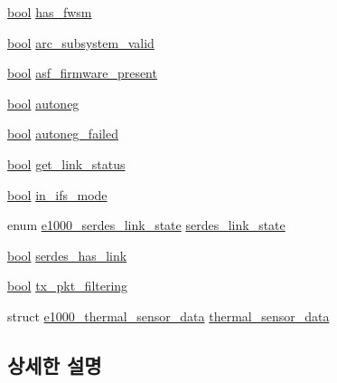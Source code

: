 \begin{DoxyCompactItemize}
\item 
\hyperlink{avb__gptp_8h_af6a258d8f3ee5206d682d799316314b1}{bool} \hyperlink{structe1000__mac__info_a7e6a1e5d6d88bd8bd3ad0b38791562ac}{has\+\_\+fwsm}
\item 
\hyperlink{avb__gptp_8h_af6a258d8f3ee5206d682d799316314b1}{bool} \hyperlink{structe1000__mac__info_accbb8e3943e55029a810bd38b616a8f0}{arc\+\_\+subsystem\+\_\+valid}
\item 
\hyperlink{avb__gptp_8h_af6a258d8f3ee5206d682d799316314b1}{bool} \hyperlink{structe1000__mac__info_aec5701ac9ed699c35dc2accc35b1c473}{asf\+\_\+firmware\+\_\+present}
\item 
\hyperlink{avb__gptp_8h_af6a258d8f3ee5206d682d799316314b1}{bool} \hyperlink{structe1000__mac__info_a062c0e2af8df1b0f13d20b02dceae500}{autoneg}
\item 
\hyperlink{avb__gptp_8h_af6a258d8f3ee5206d682d799316314b1}{bool} \hyperlink{structe1000__mac__info_a323c5f398a127c5668b296a71e00572e}{autoneg\+\_\+failed}
\item 
\hyperlink{avb__gptp_8h_af6a258d8f3ee5206d682d799316314b1}{bool} \hyperlink{structe1000__mac__info_aa7d2ab66f2a3ad9607f0edbfd81d1a17}{get\+\_\+link\+\_\+status}
\item 
\hyperlink{avb__gptp_8h_af6a258d8f3ee5206d682d799316314b1}{bool} \hyperlink{structe1000__mac__info_a435bf13941d73fff0c98a1c6420324b2}{in\+\_\+ifs\+\_\+mode}
\item 
enum \hyperlink{kmod_2igb_2e1000__hw_8h_acbafae437c9f6641c445d7154cd89061}{e1000\+\_\+serdes\+\_\+link\+\_\+state} \hyperlink{structe1000__mac__info_abe5efa4f279c0c110cd84fc0452842f2}{serdes\+\_\+link\+\_\+state}
\item 
\hyperlink{avb__gptp_8h_af6a258d8f3ee5206d682d799316314b1}{bool} \hyperlink{structe1000__mac__info_a0261cd7a35fe0745ebd5e2178b064673}{serdes\+\_\+has\+\_\+link}
\item 
\hyperlink{avb__gptp_8h_af6a258d8f3ee5206d682d799316314b1}{bool} \hyperlink{structe1000__mac__info_a90cde7eebf02da4f2821febabc1452ad}{tx\+\_\+pkt\+\_\+filtering}
\item 
struct \hyperlink{structe1000__thermal__sensor__data}{e1000\+\_\+thermal\+\_\+sensor\+\_\+data} \hyperlink{structe1000__mac__info_aa744b7687a1fe9a106782767cb572461}{thermal\+\_\+sensor\+\_\+data}
\end{DoxyCompactItemize}


\subsection{상세한 설명}


